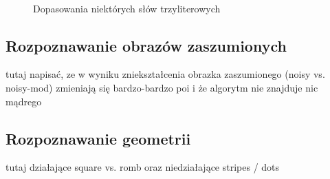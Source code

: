 \documentclass[a4paper,12pt,leqno]{article}
\begin{document}
\begin{figure}\centering
{}\\
\hspace{5mm}
\caption{Dopasowania niektórych słów trzyliterowych}
\end{figure}

\subsection{Rozpoznawanie obrazów zaszumionych}
tutaj napisać, ze w wyniku zniekształcenia obrazka zaszumionego (noisy vs. noisy-mod) zmieniają się bardzo-bardzo poi i że algorytm nie znajduje nic mądrego

\subsection{Rozpoznawanie geometrii}
tutaj działające square vs. romb oraz niedziałające stripes / dots
\end{document}
